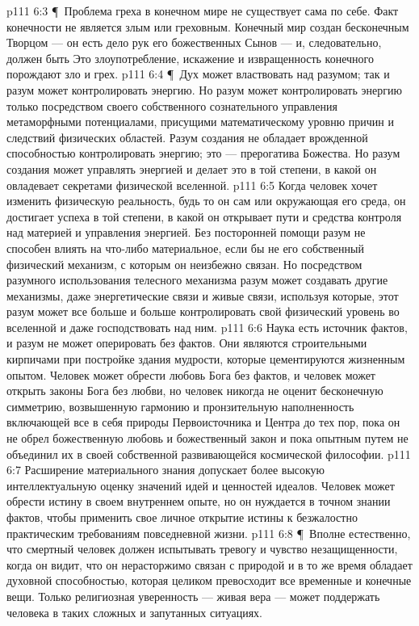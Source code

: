 \vs p111 6:3 \P\ Проблема греха в конечном мире не существует сама по себе. Факт конечности не является злым или греховным. Конечный мир создан бесконечным Творцом --- он есть дело рук его божественных Сынов --- и, следовательно, должен быть  Это злоупотребление, искажение и извращенность конечного порождают зло и грех.
\vs p111 6:4 \P\ Дух может властвовать над разумом; так и разум может контролировать энергию. Но разум может контролировать энергию только посредством своего собственного сознательного управления метаморфными потенциалами, присущими математическому уровню причин и следствий физических областей. Разум создания не обладает врожденной способностью контролировать энергию; это --- прерогатива Божества. Но разум создания может управлять энергией и делает это в той степени, в какой он овладевает секретами физической вселенной.
\vs p111 6:5 Когда человек хочет изменить физическую реальность, будь то он сам или окружающая его среда, он достигает успеха в той степени, в какой он открывает пути и средства контроля над материей и управления энергией. Без посторонней помощи разум не способен влиять на что\hyp{}либо материальное, если бы не его собственный физический механизм, с которым он неизбежно связан. Но посредством разумного использования телесного механизма разум может создавать другие механизмы, даже энергетические связи и живые связи, используя которые, этот разум может все больше и больше контролировать свой физический уровень во вселенной и даже господствовать над ним.
\vs p111 6:6 Наука есть источник фактов, и разум не может оперировать без фактов. Они являются строительными кирпичами при постройке здания мудрости, которые цементируются жизненным опытом. Человек может обрести любовь Бога без фактов, и человек может открыть законы Бога без любви, но человек никогда не оценит бесконечную симметрию, возвышенную гармонию и пронзительную наполненность включающей все в себя природы Первоисточника и Центра до тех пор, пока он не обрел божественную любовь и божественный закон и пока опытным путем не объединил их в своей собственной развивающейся космической философии.
\vs p111 6:7 Расширение материального знания допускает более высокую интеллектуальную оценку значений идей и ценностей идеалов. Человек может обрести истину в своем внутреннем опыте, но он нуждается в точном знании фактов, чтобы применить свое личное открытие истины к безжалостно практическим требованиям повседневной жизни.
\vs p111 6:8 \P\ Вполне естественно, что смертный человек должен испытывать тревогу и чувство незащищенности, когда он видит, что он нерасторжимо связан с природой и в то же время обладает духовной способностью, которая целиком превосходит все временные и конечные вещи. Только религиозная уверенность --- живая вера --- может поддержать человека в таких сложных и запутанных ситуациях.
